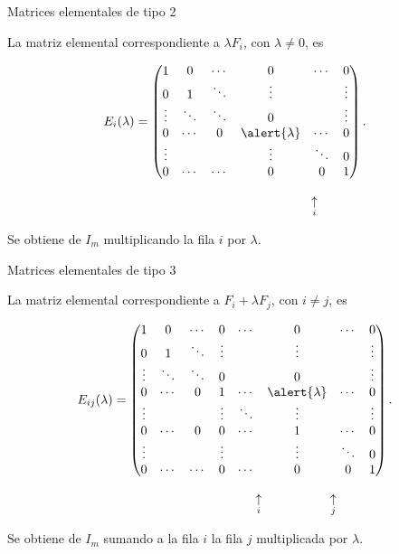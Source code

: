 \begin{frame}{Matrices elementales de tipo 2}

La matriz elemental correspondiente a
\(\lambda F_i\), con \(\lambda\neq0\), es

\[
E_i(\lambda)=
\begin{pmatrix}
1      & 0      & \cdots & 0               & \cdots & 0\\
0      & 1      & \ddots & \vdots          &        & \vdots\\
\vdots & \ddots & \ddots & 0               &        & \vdots\\
0      & \cdots & 0      & \alert{\lambda} & \cdots & 0\\
\vdots &        &        & \vdots          & \ddots & 0\\
0      & \cdots & \cdots & 0               & 0      & 1
\end{pmatrix}.
\]

\[
\hspace{44mm}
\underset{i}{\uparrow}
\]

Se obtiene de \(I_m\) multiplicando la fila \(i\) por \(\lambda\).

\end{frame}

\begin{frame}{Matrices elementales de tipo 3}

La matriz elemental correspondiente a
\(F_i+\lambda F_j\), con \(i\neq j\), es

\[
E_{ij}(\lambda)=
\begin{pmatrix}
1      & 0      & \cdots & 0      & \cdots & 0               & \cdots & 0\\
0      & 1      & \ddots & \vdots &        & \vdots          &        & \vdots\\
\vdots & \ddots & \ddots & 0      &        & 0               &        & \vdots\\
0      & \cdots & 0      & 1      & \cdots & \alert{\lambda} & \cdots & 0\\
\vdots &        &        & \vdots & \ddots & \vdots          &        & \vdots\\
0      & \cdots & 0      & 0      & \cdots & 1               & \cdots & 0\\
\vdots &        &        & \vdots &        & \vdots          & \ddots & 0\\
0      & \cdots & \cdots & 0      & \cdots & 0               & 0      & 1
\end{pmatrix}.
\]

\[
\hspace{34mm}
\underset{i}{\uparrow}
\hspace{19mm}
\underset{j}{\uparrow}
\]

Se obtiene de \(I_m\) sumando a la fila \(i\) la fila \(j\)
multiplicada por \(\lambda\).

\end{frame}

